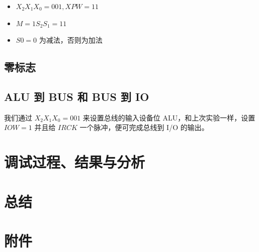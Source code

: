 \documentclass[a4paper,10pt,UTF8]{paper}
\numberwithin{equation}{section}
\numberwithin{figure}{section}
\begin{document}
\begin{itemize}
  \item $X_2X_1X_0=001,XPW=11$
  \item $M=1 S_2S_1=11$
  \item $S0=0$ 为减法，否则为加法
\end{itemize}


\subsection{零标志}



\subsection{ ALU 到 BUS 和 BUS 到 IO}



我们通过 $X_2X_1X_0 = 001$ 来设置总线的输入设备位 ALU，和上次实验一样，设置 $IOW = 1$ 并且给 $IRCK$ 一个脉冲，便可完成总线到 I/O 的输出。




\section{调试过程、结果与分析}

\section{总结}

\section{附件}
\end{document}
